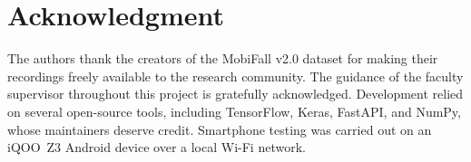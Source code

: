 \documentclass[journal]{IEEEtran}
\begin{document}
\section*{Acknowledgment}

The authors thank the creators of the MobiFall v2.0 dataset for making their
recordings freely available to the research community. The guidance of the
faculty supervisor throughout this project is gratefully acknowledged.
Development relied on several open-source tools, including TensorFlow, Keras,
FastAPI, and NumPy, whose maintainers deserve credit. Smartphone testing was
carried out on an iQOO~Z3 Android device over a local Wi-Fi network.





\end{document}

